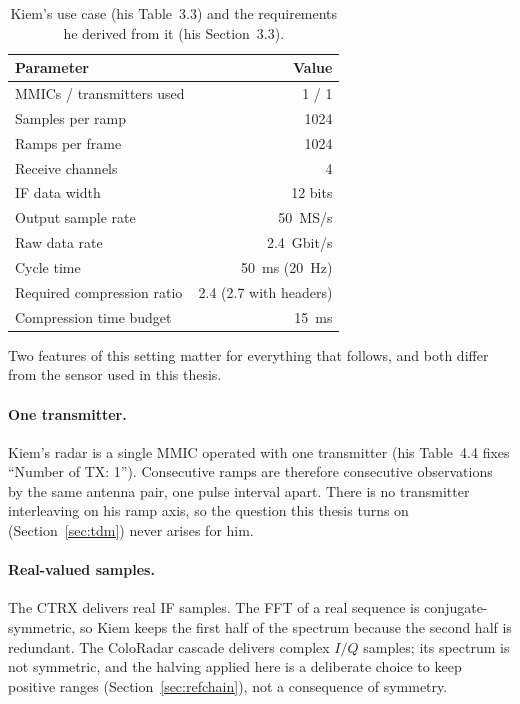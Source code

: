 \begin{table}[htbp]
\centering
\caption[Kiem's use case]{Kiem's use case (his Table~3.3) and the
requirements he derived from it (his Section~3.3).}
\label{tab:kiem_usecase}
\small
\begin{tabular}{@{}lr@{}}
\toprule
Parameter & Value\\
\midrule
MMICs / transmitters used & 1 / 1\\
Samples per ramp & 1024\\
Ramps per frame & 1024\\
Receive channels & 4\\
IF data width & 12 bits\\
Output sample rate & \SI{50}{MS/s}\\
Raw data rate & \SI{2.4}{Gbit/s}\\
Cycle time & \SI{50}{\milli\second} (\SI{20}{\hertz})\\
\midrule
Required compression ratio & 2.4 (2.7 with headers)\\
Compression time budget & \SI{15}{\milli\second}\\
\bottomrule
\end{tabular}
\end{table}

Two features of this setting matter for everything that follows, and both
differ from the sensor used in this thesis.

\paragraph{One transmitter.} Kiem's radar is a single MMIC operated with one
transmitter (his Table~4.4 fixes ``Number of TX: 1''). Consecutive ramps are
therefore consecutive observations by the same antenna pair, one pulse interval
apart. There is no transmitter interleaving on his ramp axis, so the question
this thesis turns on (Section~\ref{sec:tdm}) never arises for him.

\paragraph{Real-valued samples.} The CTRX delivers real IF samples. The FFT of
a real sequence is conjugate-symmetric, so Kiem keeps the first half of the
spectrum because the second half is redundant. The ColoRadar cascade delivers
complex $I/Q$ samples; its spectrum is not symmetric, and the halving applied
here is a deliberate choice to keep positive ranges
(Section~\ref{sec:refchain}), not a consequence of symmetry.

